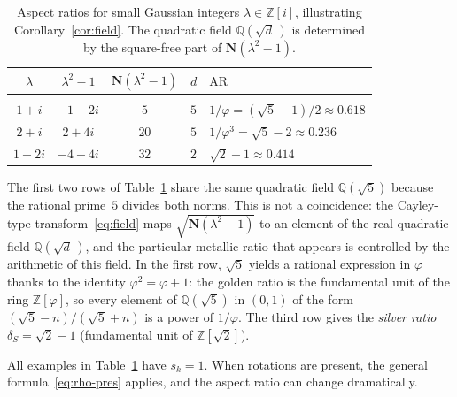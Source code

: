 \documentclass{amsart}
\theoremstyle{definition}
\theoremstyle{remark}
\begin{document}
\begin{table}[ht]
\centering
\small
\caption{Aspect ratios for small Gaussian integers $\lambda\in\mathbb{Z}[i]$,
illustrating Corollary~\ref{cor:field}.
The quadratic field $\mathbb{Q}(\sqrt{d}\,)$ is determined by the
square-free part of $\mathbf{N}(\lambda^2-1)$.}
\label{tab:examples}
\begin{tabular}{ccccl}
$\lambda$ & $\lambda^2-1$ & $\mathbf{N}(\lambda^2-1)$ & $d$ & $\mathrm{AR}$ \\[2pt]
\hline\\[-8pt]
$1+i$  & $-1+2i$  & $5$  & $5$ & $1/\varphi = (\sqrt{5}-1)/2 \approx 0.618$ \\
$2+i$  & $2+4i$   & $20$ & $5$ & $1/\varphi^3 = \sqrt{5}-2 \approx 0.236$ \\
$1+2i$ & $-4+4i$  & $32$ & $2$ & $\sqrt{2}-1 \approx 0.414$ \\
\end{tabular}
\end{table}

\noindent
The first two rows of Table~\ref{tab:examples} share the same quadratic
field $\mathbb{Q}(\sqrt{5})$
because the rational prime~$5$ divides both norms.
This is not a coincidence: the Cayley-type transform~\eqref{eq:field}
maps $\sqrt{\mathbf{N}(\lambda^2-1)}$ to an element of the
real quadratic field $\mathbb{Q}(\sqrt{d}\,)$, and the particular
metallic ratio that appears is controlled by the arithmetic of this field.
In the first row, $\sqrt{5}$ yields a rational expression in $\varphi$
thanks to the identity $\varphi^2 = \varphi+1$: the golden ratio is the
fundamental unit of the ring $\mathbb{Z}[\varphi]$, so every element of
$\mathbb{Q}(\sqrt{5})$ in $(0,1)$ of the form
$(\sqrt{5}-n)/(\sqrt{5}+n)$ is a power of $1/\varphi$.
The third row gives the \emph{silver ratio} $\delta_S = \sqrt{2}-1$
(fundamental unit of $\mathbb{Z}[\sqrt{2}]$).

All examples in Table~\ref{tab:examples} have $s_k=1$.
When rotations are present, the general formula~\eqref{eq:rho-pres}
applies, and the aspect ratio can change dramatically.
\end{document}

